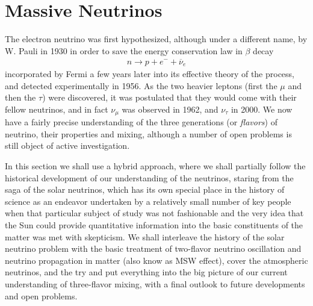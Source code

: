 \chapter{Massive Neutrinos}\label{chap:nu}

The electron neutrino was first hypothesized, although under a different name,
by W. Pauli in 1930 in order to save the energy conservation law in $\beta$
decay
\begin{align}
  n \rightarrow p + e^- + \overline{\nu}_e
\end{align}
incorporated by Fermi a few years later into its effective theory of the process,
and detected experimentally in 1956.
As the two heavier leptons (first the $\mu$ and then the $\tau$) were discovered, it
was postulated that they would come with their fellow neutrinos, and in fact $\nu_\mu$
was observed in 1962, and $\nu_\tau$ in 2000. We now have a fairly precise understanding
of the three generations (or \emph{flavors}) of neutrino, their properties and
mixing, although a number of open problems is still object of active investigation.

In this section we shall use a hybrid approach, where we shall partially follow
the historical development of our understanding of the neutrinos, staring from the
saga of the solar neutrinos, which has its own special place in the history of science
as an endeavor undertaken by a relatively small number of key people when that particular
subject of study was not fashionable and the very idea that the Sun could provide
quantitative information into the basic constituents of the matter was met with skepticism.
We shall interleave the history of the solar neutrino problem with the basic treatment
of two-flavor neutrino oscillation and neutrino propagation in matter (also know as
MSW effect), cover the atmospheric neutrinos, and the try and put everything into the
big picture of our current understanding of three-flavor mixing, with a final outlook
to future developments and open problems.



